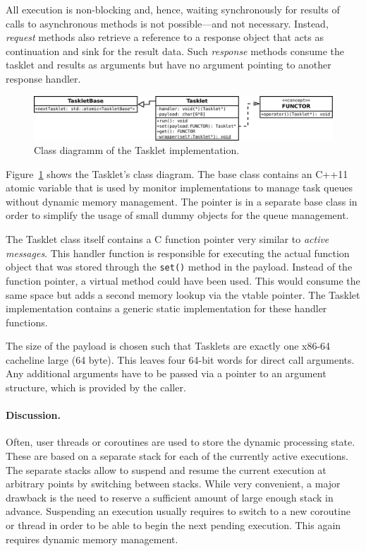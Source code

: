 All execution is non-blocking and, hence, waiting synchronously for results of calls to asynchronous methods is not possible---and not necessary. Instead, \emph{request} methods also retrieve a reference to a response object that acts as continuation and sink for the result data. Such \emph{response} methods consume the tasklet and results as arguments but have no argument pointing to another response handler.

\begin{figure}
  \centering
  \includegraphics[scale=0.25]{fig/tasklet-class.pdf}
  \caption{Class diagramm of the Tasklet implementation.}
  \label{fig:tasklet-class}
\end{figure}

Figure~\ref{fig:tasklet-class} shows the Tasklet's class diagram. The base class contains an C++11 atomic variable that is used by monitor implementations to manage task queues without dynamic memory management. The pointer is in a separate base class in order to simplify the usage of small dummy objects for the queue management. 

The Tasklet class itself contains a C function pointer very similar to \emph{active messages}. This handler function is responsible for executing the actual function object that was stored through the \lstinline|set()| method in the payload. Instead of the function pointer, a virtual method could have been used. This would consume the same space but adds a second memory lookup via the vtable pointer. The Tasklet implementation contains a generic static implementation for these handler functions.

The size of the payload is chosen such that Tasklets are exactly one x86-64 cacheline large (64 byte). This leaves four 64-bit words for direct call arguments. Any additional arguments have to be passed via a pointer to an argument structure, which is provided by the caller.

\paragraph{Discussion.}
Often, user threads or coroutines are used to store the dynamic processing state. These are based on a separate stack for each of the currently active executions. The separate stacks allow to suspend and resume the current execution at arbitrary points by switching between stacks. While very convenient, a major drawback is the need to reserve a sufficient amount of large enough stack in advance. Suspending an execution usually requires to switch to a new coroutine or thread in order to be able to begin the next pending execution. This again requires dynamic memory management.

